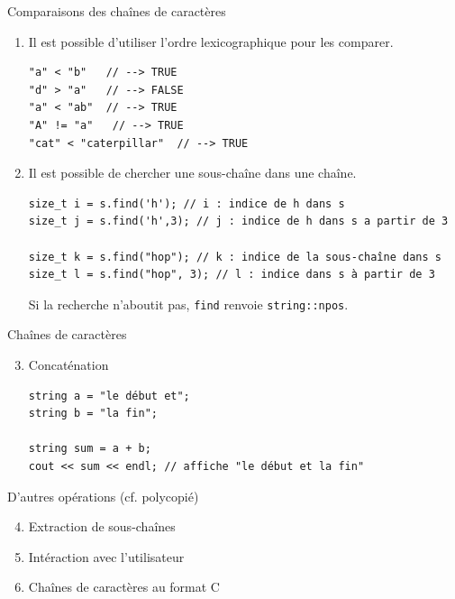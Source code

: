 \begin{frame}[fragile]{Comparaisons des chaînes de caractères}
    \begin{enumerate}
        \setcounter{enumi}{0}
        \item Il est possible d'utiliser l'ordre lexicographique pour les comparer.
        \begin{verbatim}
"a" < "b"   // --> TRUE
"d" > "a"   // --> FALSE
"a" < "ab"  // --> TRUE
"A" != "a"   // --> TRUE
"cat" < "caterpillar"  // --> TRUE
        \end{verbatim}
    \end{enumerate}
    \begin{enumerate}
        \setcounter{enumi}{1}
        \item Il est possible de chercher une sous-chaîne dans une chaîne.
        \begin{verbatim}
size_t i = s.find('h'); // i : indice de h dans s
size_t j = s.find('h',3); // j : indice de h dans s a partir de 3

size_t k = s.find("hop"); // k : indice de la sous-chaîne dans s
size_t l = s.find("hop", 3); // l : indice dans s à partir de 3
        \end{verbatim}
        Si la recherche n'aboutit pas, \texttt{find} renvoie \texttt{string::npos}.
    \end{enumerate}
\end{frame}

\begin{frame}[fragile]{Chaînes de caractères}
    \begin{enumerate}
        \setcounter{enumi}{2}
        \item Concaténation
        \begin{verbatim}
string a = "le début et";
string b = "la fin";

string sum = a + b;
cout << sum << endl; // affiche "le début et la fin"
        \end{verbatim}
    \end{enumerate}
    \begin{block}{D'autres opérations (cf. polycopié)}
    \begin{enumerate}
        \setcounter{enumi}{3}
        \item Extraction de sous-chaînes
        \item Intéraction avec l'utilisateur
        \item Chaînes de caractères au format C
    \end{enumerate}
    \end{block}
\end{frame}

